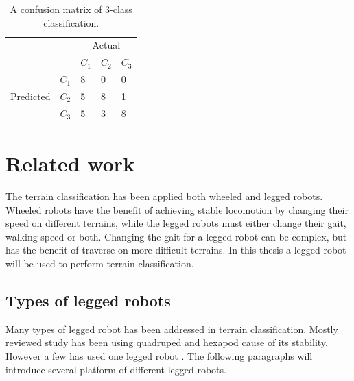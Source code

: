 \documentclass[USenglish]{ifimaster}  %
\begin{document}
	\begin{table}[h]
		\centering
		\begin{tabular}{ll|l|l|l|}
			\cline{3-5}
			&  & \multicolumn{3}{c|}{Actual} \\ \cline{3-5} 
			&  & $C_1$ & $C_2$ & $C_3$ \\ \hline
			\multicolumn{1}{|l|}{\multirow{3}{*}{Predicted}} & $C_1$ & 8 & 0 & 0 \\ \cline{2-5} 
			\multicolumn{1}{|l|}{} & $C_2$ & 5 & 8 & 1 \\ \cline{2-5} 
			\multicolumn{1}{|l|}{} & $C_3$ & 5 & 3 & 8 \\ \hline
		\end{tabular}
		\caption{A confusion matrix of 3-class classification.}
		\label{tab:cmatrix}
	\end{table}
	
	
\section{Related work}
The terrain classification has been applied both wheeled and legged robots. Wheeled robots have the benefit of achieving stable locomotion by changing their speed on different terrains, while the legged robots must either change their gait, walking speed or both. Changing the gait for a legged robot can be complex, but has the benefit of traverse on more difficult terrains. In this thesis a legged robot will be used to perform terrain classification.
	
\subsection{Types of legged robots}
Many types of legged robot has been addressed in terrain classification. Mostly reviewed study has been using quadruped \cite{6784609,littleDog,6849778,Hoffmann20141790} and hexapod \cite{Walas2015,26b23e912c654fe4b7478fd910130195,6569179} cause of its stability. However a few has used one legged robot \cite{5602459}. The following paragraphs will introduce several platform of different legged robots.
	
	
\end{document}
